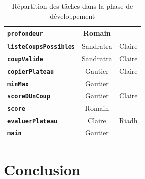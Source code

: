 \documentclass[11pt]{report}
\begin{document}
\begin{table}[h]
\begin{center}
\begin{tabular}{c|c|c|}
  \multicolumn{1}{|l|}{\textbf{\texttt{profondeur}}} & Romain & \cellcolor{lightgray} \\ \hline
  \multicolumn{1}{|l|}{\textbf{\texttt{listeCoupsPossibles}}} & Sandratra & Claire \\ \hline
 \multicolumn{1}{|l|}{ \textbf{\texttt{coupValide}}} & Sandratra & Claire\\ \hline
  \multicolumn{1}{|l|}{\textbf{\texttt{copierPlateau}}} & Gautier & Claire \\ \hline
  \multicolumn{1}{|l|}{\textbf{\texttt{minMax}}} & Gautier & \cellcolor{lightgray} \\ \hline
  \multicolumn{1}{|l|}{\textbf{\texttt{scoreDUnCoup}}} & Gautier & Claire \\ \hline
  \multicolumn{1}{|l|}{\textbf{\texttt{score}}} & Romain &   \cellcolor{lightgray}  \\ \hline
 \multicolumn{1}{|l|}{ \textbf{\texttt{evaluerPlateau}}} & Claire &  Riadh \\ \hline
 \multicolumn{1}{|l|}{ \textbf{\texttt{main}}} & Gautier & \cellcolor{lightgray} \\ \hline
\end{tabular}
\end{center}
\caption{Répartition des tâches dans la phase de développement}
\end{table}
\thispagestyle{plain}
\chapter*{Conclusion}
\end{document}
